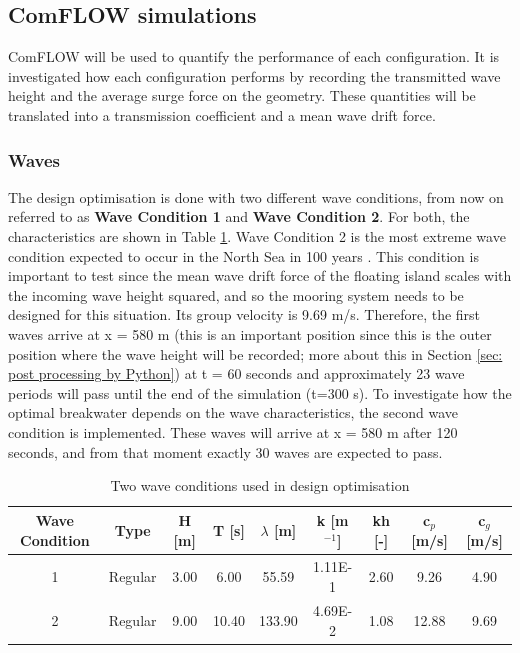 \subsection{ComFLOW simulations}
\label{subsec: methodology comflow}
ComFLOW will be used to quantify the performance of each configuration. It is investigated how each configuration performs by recording the transmitted wave height and the average surge force on the geometry. These quantities will be translated into a transmission coefficient and a mean wave drift force. 


\subsubsection{Waves}
The design optimisation is done with two different wave conditions, from now on referred to as \textbf{Wave Condition 1} and \textbf{Wave Condition 2}. For both, the characteristics are shown in Table \ref{tab: wave conditions}. Wave Condition 2 is the most extreme wave condition expected to occur in the North Sea in 100 years \citep{Fery2019}. This condition is important to test since the mean wave drift force of the floating island scales with the incoming wave height squared, and so the mooring system needs to be designed for this situation. Its group velocity is 9.69 m/s. Therefore, the first waves arrive at x = 580 m (this is an important position since this is the outer position where the wave height will be recorded; more about this in Section \ref{sec: post processing by Python}) at t = 60 seconds and approximately 23 wave periods will pass until the end of the simulation (t=300 s). To investigate how the optimal breakwater depends on the wave characteristics, the second wave condition is implemented. These waves will arrive at x = 580 m after 120 seconds, and from that moment exactly 30 waves are expected to pass. 

\begin{table}[h]
\begin{tabular}{@{}ccccccccc@{}}
\toprule
Wave Condition & Type    & H {[}m{]} & T {[}s{]} & $\lambda$ {[}m{]} & k {[}m$^{-1}${]} & kh {[}-{]} & c$_p$ {[}m/s{]} & c$_g$ {[}m/s{]} \\ \midrule
1              & Regular & 3.00      & 6.00      & 55.59            & 1.11E-1          & 2.60       & 9.26            & 4.90            \\
2              & Regular & 9.00      & 10.40     & 133.90           & 4.69E-2          & 1.08       & 12.88           & 9.69            \\
 \bottomrule
\end{tabular}
\caption{Two wave conditions used in design optimisation}
\label{tab: wave conditions}
\end{table}


